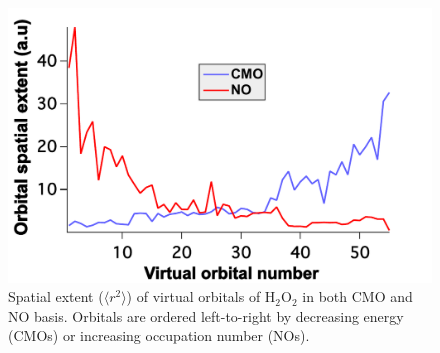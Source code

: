 \begin{figure}
  \centering
  \includegraphics[width=0.6\linewidth]{figures/spatial.pdf}
  \caption{\footnotesize{Spatial extent ($\langle r^2\rangle$) of virtual
orbitals of H$_2$O$_2$ in both CMO and NO basis.  Orbitals are ordered
left-to-right by
decreasing energy (CMOs) or increasing occupation number (NOs).}}
   \label{fig:spatial}
\end{figure}

